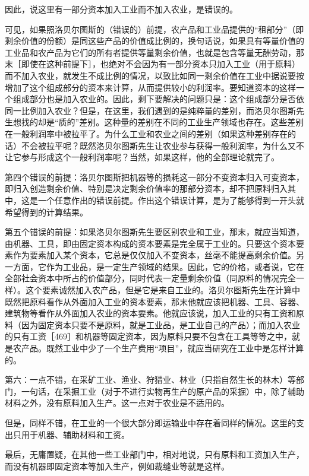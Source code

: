 因此，说这里有一部分资本加入工业而不加入农业，是错误的。

可见，如果照洛贝尔图斯的（错误的）前提，农产品和工业品提供的“租部分”（即剩余价值的份额）是同这些产品的价值成比例的，换句话说，如果具有等量价值的工业品和农产品为它们的所有者提供等量剩余价值，也就是包含等量无酬劳动，那末［即使在这种前提下］，也绝对不会因为有一部分资本只加入工业（用于原料）而不加入农业，就发生不成比例的情况，以致比如同一剩余价值在工业中据说要按增加了这个组成部分的资本来计算，从而提供较小的利润率。要知道资本的这样一个组成部分也是加入农业的。因此，剩下要解决的问题只是：这个组成部分是否依同一比例加入农业？但是，在这里，我们遇到的是纯粹量的差别，而洛贝尔图斯先生想找的却是“质的”差别。这种量的差别在不同的工业生产领域也存在。这些差别在一般利润率中被拉平了。为什么工业和农业之间的差别（如果这种差别存在的话）不会被拉平呢？既然洛贝尔图斯先生让农业参与获得一般利润率，为什么又不让它参与形成这个一般利润率呢？当然，如果这样，他的全部理论就完了。

第四个错误的前提：洛贝尔图斯把机器等的损耗这一部分不变资本归入可变资本，即归入创造剩余价值、特别是决定剩余价值率的那部分资本，却不把原料归入其中，这是一个任意作出的错误前提。作出这个错误计算，是为了能够得到一开头就希望得到的计算结果。

第五个错误的前提：如果洛贝尔图斯先生要区别农业和工业，那末，就应当知道，由机器、工具，即由固定资本构成的资本要素是完全属于工业的。只要这个资本要素作为要素加入某个资本，它总是仅仅加入不变资本，丝毫不能提高剩余价值。另一方面，它作为工业品，是一定生产领域的结果。因此，它的价格，或者说，它在全部社会资本中所占的价值部分，同时代表一定量剩余价值（同原料的情况完全一样）。这个要素诚然加入农产品，但是它是来自工业的。洛贝尔图斯先生在计算中既然把原料看作从外面加入工业的资本要素，那末他就应该把机器、工具、容器、建筑物等看作从外面加入农业的资本要素。他就应该说，加入工业的只有工资和原料（因为固定资本只要不是原料，就是工业品，是工业自己的产品）；而加入农业的只有工资［469］和机器等固定资本，因为原料只要不包含在工具等等之中，就是农产品。既然工业中少了一个生产费用“项目”，就应当研究在工业中是怎样计算的。

第六：一点不错，在采矿工业、渔业、狩猎业、林业（只指自然生长的林木）等部门，一句话，在采掘工业（对于不进行实物再生产的原产品的采掘）中，除了辅助材料之外，没有原料加入生产。这一点对于农业是不适用的。

但是，同样不错，在工业的一个很大部分即运输业中存在着同样的情况。这里的支出只用于机器、辅助材料和工资。

最后，无庸置疑，在其他一些工业部门中，相对地说，只有原料和工资加入生产，而没有机器即固定资本等加入生产，例如裁缝业等就是这样。

